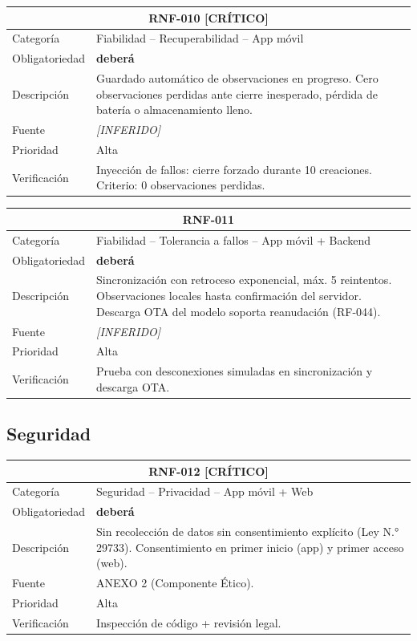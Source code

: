 \documentclass[12pt, a4paper]{article}
\newcommand{\criticomark}{\textcolor{criticolor}{\textbf{[CR\'ITICO]}}}
\newcommand{\inferido}{\textcolor{medio}{\textit{[INFERIDO]}}}
\begin{document}
\begin{longtable}{|p{3cm}|p{11.5cm}|}
\hline
\multicolumn{2}{|c|}{\textbf{RNF-010} \criticomark} \\
\hline
Categor\'ia & Fiabilidad -- Recuperabilidad -- App m\'ovil \\
\hline
Obligatoriedad & \textbf{deber\'a} \\
\hline
Descripci\'on & Guardado autom\'atico de observaciones en progreso. Cero observaciones perdidas ante cierre inesperado, p\'erdida de bater\'ia o almacenamiento lleno. \\
\hline
Fuente & \inferido{} \\
\hline
Prioridad & Alta \\
\hline
Verificaci\'on & Inyecci\'on de fallos: cierre forzado durante 10 creaciones. Criterio: 0 observaciones perdidas. \\
\hline
\end{longtable}

\begin{longtable}{|p{3cm}|p{11.5cm}|}
\hline
\multicolumn{2}{|c|}{\textbf{RNF-011}} \\
\hline
Categor\'ia & Fiabilidad -- Tolerancia a fallos -- App m\'ovil + Backend \\
\hline
Obligatoriedad & \textbf{deber\'a} \\
\hline
Descripci\'on & Sincronizaci\'on con retroceso exponencial, m\'ax. 5 reintentos. Observaciones locales hasta confirmaci\'on del servidor. Descarga OTA del modelo soporta reanudaci\'on (RF-044). \\
\hline
Fuente & \inferido{} \\
\hline
Prioridad & Alta \\
\hline
Verificaci\'on & Prueba con desconexiones simuladas en sincronizaci\'on y descarga OTA. \\
\hline
\end{longtable}

\subsection{Seguridad}

\begin{longtable}{|p{3cm}|p{11.5cm}|}
\hline
\multicolumn{2}{|c|}{\textbf{RNF-012} \criticomark} \\
\hline
Categor\'ia & Seguridad -- Privacidad -- App m\'ovil + Web \\
\hline
Obligatoriedad & \textbf{deber\'a} \\
\hline
Descripci\'on & Sin recolecci\'on de datos sin consentimiento expl\'icito (Ley N.° 29733). Consentimiento en primer inicio (app) y primer acceso (web). \\
\hline
Fuente & ANEXO 2 (Componente \'Etico). \\
\hline
Prioridad & Alta \\
\hline
Verificaci\'on & Inspecci\'on de c\'odigo + revisi\'on legal. \\
\hline
\end{longtable}
\end{document}
